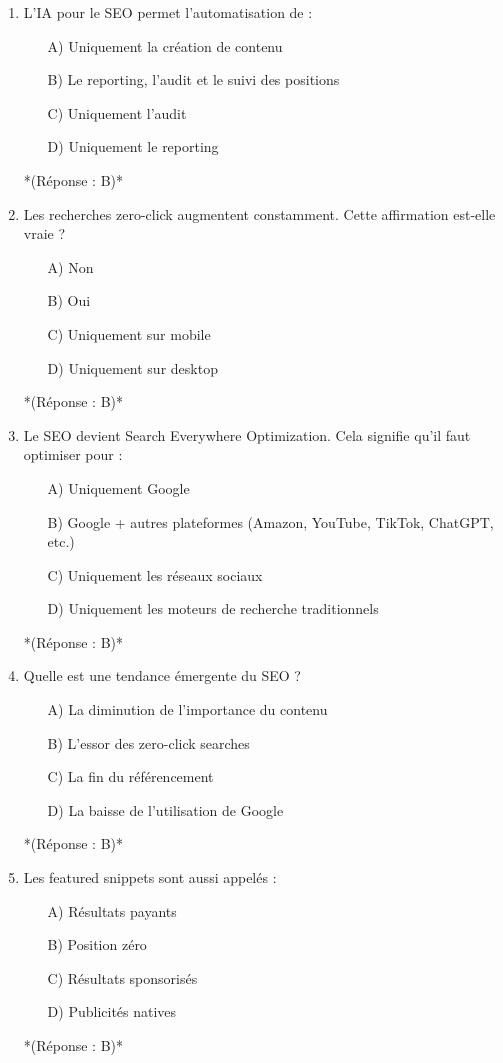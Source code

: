\documentclass[12pt,a4paper,twoside]{report}
\begin{document}
\begin{enumerate}
    \item L'IA pour le SEO permet l'automatisation de :
    \begin{itemize}
        \item[A)] Uniquement la création de contenu
        \item[B)] Le reporting, l'audit et le suivi des positions
        \item[C)] Uniquement l'audit
        \item[D)] Uniquement le reporting
    \end{itemize}
    *(Réponse : B)*

    \item Les recherches zero-click augmentent constamment. Cette affirmation est-elle vraie ?
    \begin{itemize}
        \item[A)] Non
        \item[B)] Oui
        \item[C)] Uniquement sur mobile
        \item[D)] Uniquement sur desktop
    \end{itemize}
    *(Réponse : B)*

    \item Le SEO devient Search Everywhere Optimization. Cela signifie qu'il faut optimiser pour :
    \begin{itemize}
        \item[A)] Uniquement Google
        \item[B)] Google + autres plateformes (Amazon, YouTube, TikTok, ChatGPT, etc.)
        \item[C)] Uniquement les réseaux sociaux
        \item[D)] Uniquement les moteurs de recherche traditionnels
    \end{itemize}
    *(Réponse : B)*

    \item Quelle est une tendance émergente du SEO ?
    \begin{itemize}
        \item[A)] La diminution de l'importance du contenu
        \item[B)] L'essor des zero-click searches
        \item[C)] La fin du référencement
        \item[D)] La baisse de l'utilisation de Google
    \end{itemize}
    *(Réponse : B)*

    \item Les featured snippets sont aussi appelés :
    \begin{itemize}
        \item[A)] Résultats payants
        \item[B)] Position zéro
        \item[C)] Résultats sponsorisés
        \item[D)] Publicités natives
    \end{itemize}
    *(Réponse : B)*


\end{enumerate}
\end{document}
